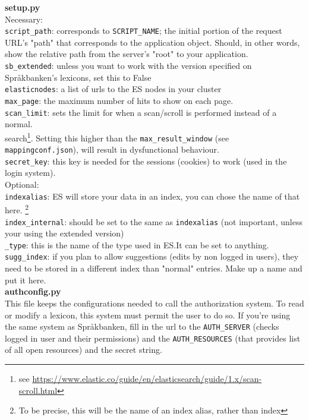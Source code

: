 \documentclass[
12pt, %
a4paper, %
oneside, %
headinclude,footinclude, %
BCOR0mm, %
]{scrartcl}
\begin{document}
\textbf{setup.py}\\
   Necessary:\\
   \verb|script_path|: corresponds to \verb|SCRIPT_NAME|;  the initial portion
                       of the request URL's "path" that corresponds to the
                       application object. Should, in other words, show the relative path from the server's
                       "root" to your application.\\
   \verb|sb_extended|: unless you want to work with the version specified on Språkbanken's lexicons, set this to False\\
   \verb|elasticnodes|: a list of urls to the ES nodes in your cluster\\
   \verb|max_page|: the maximum number of hits to show on each page.\\
   \verb|scan_limit|: sets the limit for when a scan/scroll is performed instead of a normal.\\
   search\footnote{see \url{https://www.elastic.co/guide/en/elasticsearch/guide/1.x/scan-scroll.html}}.
   Setting this higher than the \verb|max_result_window| (see
   \verb|mappingconf.json|), will result in dysfunctional behaviour.\\
   \verb|secret_key|: this key is needed for the sessions (cookies) to work (used in the login system).
\\
   Optional:\\
   \verb|indexalias|: ES will store your data in an index, you can chose the name of that here.%
   \footnote{To be precise, this will be the name of an index alias,
   rather than index}\\
   \verb|index_internal|: should be set to the same as \verb|indexalias| (not important,
   unless your using the extended version)\\
   \verb|_type|: this is the name of the type used in ES.\@ It can be set to anything.\\
   \verb|sugg_index|: if you plan to allow suggestions (edits by non logged in
   users), they need to be stored in a different index than "normal" entries. Make up a name and
   put it here.\\

\textbf{authconfig.py}\\
This file keeps the configurations needed to call the authorization system.
To read or modify a lexicon, this system must permit the user to do so.
If you're using the same system as Språkbanken,
fill in the url to the \verb|AUTH_SERVER| (checks logged in user and their
permissions) and the \verb|AUTH_RESOURCES| (that provides list of all open resources) and the secret string.\\
\end{document}
